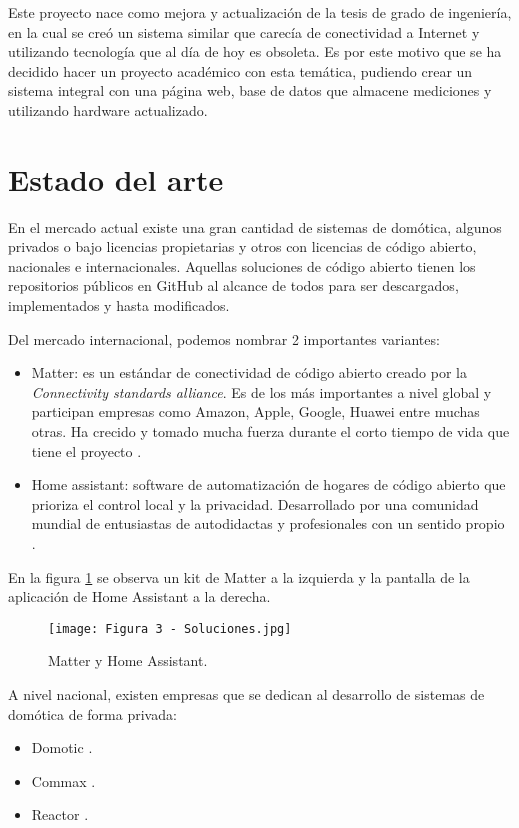 Este proyecto nace como mejora y actualización de la tesis de grado de ingeniería, en la cual se creó un sistema similar que carecía de conectividad a Internet y utilizando tecnología que al día de hoy es obsoleta. Es por este motivo que se ha decidido hacer un proyecto académico con esta temática, pudiendo crear un sistema integral con una página web, base de datos que almacene mediciones y utilizando hardware actualizado.

\section{Estado del arte}

En el mercado actual existe una gran cantidad de sistemas de domótica, algunos privados o bajo licencias propietarias y otros con licencias de código abierto, nacionales e internacionales. Aquellas soluciones de código abierto tienen los repositorios públicos en GitHub al alcance de todos para ser descargados, implementados y hasta modificados.

Del mercado internacional, podemos nombrar 2 importantes variantes:
\begin{itemize}
	\item Matter: es un estándar de conectividad de código abierto creado por la \textit{Connectivity standards alliance}. Es de los más importantes a nivel global y participan empresas como Amazon, Apple, Google, Huawei entre muchas otras. Ha crecido y tomado mucha fuerza durante el corto tiempo de vida que tiene el proyecto \citep{3}.
	\item Home assistant: software de automatización de hogares de código abierto que prioriza el control local y la privacidad. Desarrollado por una comunidad mundial de entusiastas de autodidactas y profesionales con un sentido propio \citep{4}.
\end{itemize}

En la figura \ref{fig:3} se observa un kit de Matter a la izquierda y la pantalla de la aplicación de Home Assistant a la derecha.

\begin{figure}[h]
\centering
\texttt{[image: Figura 3 - Soluciones.jpg]}
\caption[Matter y Home Assistant]{Matter y Home Assistant. \protect\footnotemark}
\label{fig:3}
\end{figure}

A nivel nacional, existen empresas que se dedican al desarrollo de sistemas de domótica de forma privada:
\begin{itemize}
	\item Domotic \citep{5}.
	\item Commax \citep{6}.
	\item Reactor \citep{7}.
\end{itemize}

